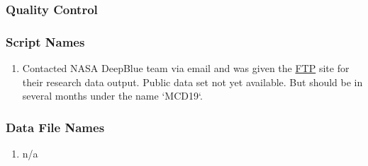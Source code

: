 \subsubsection*{Quality Control}

\subsubsection*{Script Names}

\begin{enumerate}
\item Contacted NASA DeepBlue team via email and was given the \href{ftp://dataportal.nccs.nasa.gov/DataRelease/}{FTP} site for their research data output. Public data set not yet available. But should be in several months under the name `MCD19`.
\end{enumerate}

\subsubsection*{Data File Names}

\begin{enumerate}
\item n/a
\end{enumerate}